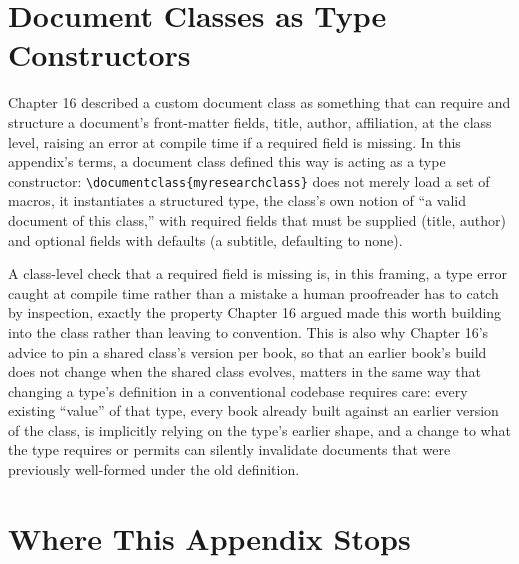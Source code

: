 \hypertarget{c.5-document-classes-as-type-constructors}{%
\section{Document Classes as Type Constructors}\label{c.5-document-classes-as-type-constructors}}

Chapter 16 described a custom document class as something that can require and structure a document's front-matter fields, title, author, affiliation, at the class level, raising an error at compile time if a required field is missing. In this appendix's terms, a document class defined this way is acting as a type constructor: \texttt{\textbackslash{}documentclass\{myresearchclass\}} does not merely load a set of macros, it instantiates a structured type, the class's own notion of ``a valid document of this class,'' with required fields that must be supplied (title, author) and optional fields with defaults (a subtitle, defaulting to none).

A class-level check that a required field is missing is, in this framing, a type error caught at compile time rather than a mistake a human proofreader has to catch by inspection, exactly the property Chapter 16 argued made this worth building into the class rather than leaving to convention. This is also why Chapter 16's advice to pin a shared class's version per book, so that an earlier book's build does not change when the shared class evolves, matters in the same way that changing a type's definition in a conventional codebase requires care: every existing ``value'' of that type, every book already built against an earlier version of the class, is implicitly relying on the type's earlier shape, and a change to what the type requires or permits can silently invalidate documents that were previously well-formed under the old definition.

\hypertarget{c.6-where-this-appendix-stops}{%
\section{Where This Appendix Stops}\label{c.6-where-this-appendix-stops}}

